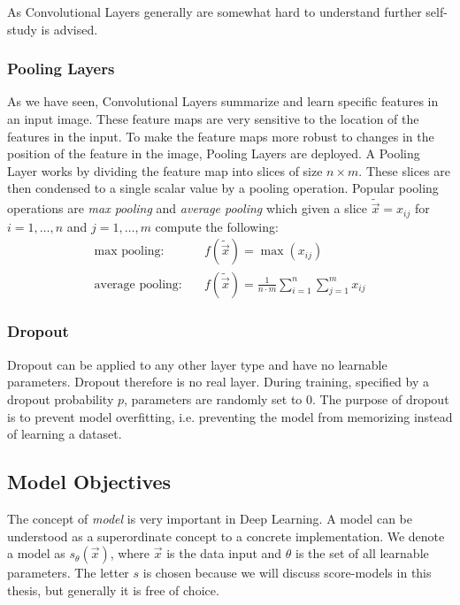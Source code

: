 As Convolutional Layers generally are somewhat hard to understand further self-study is advised.
%
\subsubsection{Pooling Layers}
As we have seen, Convolutional Layers summarize and learn specific features in an input image. These feature maps are very sensitive to the location of the features in the input. To make the feature maps more robust to changes in the position of the feature in the image, Pooling Layers are deployed. A Pooling Layer works by dividing the feature map into slices of size $n\times m$. These slices are then condensed to a single scalar value by a pooling operation. Popular pooling operations are \textit{max pooling} and \textit{average pooling} which given a slice $\tilde{\vec{x}}=x_{ij}$ for $i=1,\dots,n$ and $j=1,\dots,m$ compute the following:
%
\begin{align}
    \text{max pooling:}\quad&f(\tilde{\vec{x}})=\max(x_{ij})\\
    \text{average pooling:}\quad&f(\tilde{\vec{x}})=\frac{1}{n\cdot m}\sum_{i=1}^n\sum_{j=1}^mx_{ij}
\end{align}
%
\subsubsection{Dropout }
Dropout can be applied to any other layer type and have no learnable parameters. Dropout therefore is no real layer. During training, specified by a dropout probability $p$, parameters are randomly set to $0$. The purpose of dropout is to prevent model overfitting, i.e. preventing the model from memorizing instead of learning a dataset.
%
\subsection{Model Objectives}
The concept of \textit{model} is very important in Deep Learning. A model can be understood as a superordinate concept to a concrete implementation. We denote a model as $s_\theta(\vec{x})$, where $\vec{x}$ is the data input and $\theta$ is the set of all learnable parameters. The letter $s$ is chosen because we will discuss score-models in this thesis, but generally it is free of choice.

